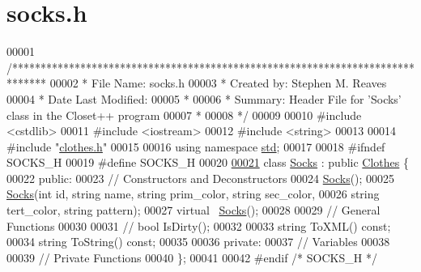\hypertarget{socks_8h_source}{}\section{socks.\+h}

\begin{DoxyCode}
00001 \textcolor{comment}{/******************************************************************************}
00002 \textcolor{comment}{ * File Name: socks.h}
00003 \textcolor{comment}{ * Created by: Stephen M. Reaves}
00004 \textcolor{comment}{ * Date Last Modified:}
00005 \textcolor{comment}{ *}
00006 \textcolor{comment}{ * Summary: Header File for 'Socks' class in the Closet++ program}
00007 \textcolor{comment}{ *}
00008 \textcolor{comment}{ */}
00009 
00010 \textcolor{preprocessor}{#include <cstdlib>}
00011 \textcolor{preprocessor}{#include <iostream>}
00012 \textcolor{preprocessor}{#include <string>}
00013 
00014 \textcolor{preprocessor}{#include "\mbox{\hyperlink{clothes_8h}{clothes.h}}"}
00015 
00016 \textcolor{keyword}{using namespace }\mbox{\hyperlink{namespacestd}{std}};
00017 
00018 \textcolor{preprocessor}{#ifndef SOCKS\_H}
00019 \textcolor{preprocessor}{#define SOCKS\_H}
00020 
\mbox{\hyperlink{classSocks}{00021}} \textcolor{keyword}{class }\mbox{\hyperlink{classSocks}{Socks}} : \textcolor{keyword}{public} \mbox{\hyperlink{classClothes}{Clothes}} \{
00022  \textcolor{keyword}{public}:
00023   \textcolor{comment}{// Constructors and Deconstructors}
00024   \mbox{\hyperlink{classSocks}{Socks}}();
00025   \mbox{\hyperlink{classSocks}{Socks}}(\textcolor{keywordtype}{int} \textcolor{keywordtype}{id}, \textcolor{keywordtype}{string} name, \textcolor{keywordtype}{string} prim\_color, \textcolor{keywordtype}{string} sec\_color,
00026         \textcolor{keywordtype}{string} tert\_color, \textcolor{keywordtype}{string} pattern);
00027   \textcolor{keyword}{virtual} ~\mbox{\hyperlink{classSocks}{Socks}}();
00028 
00029   \textcolor{comment}{// General Functions}
00030 
00031   \textcolor{comment}{// bool IsDirty();}
00032 
00033   \textcolor{keywordtype}{string} ToXML() \textcolor{keyword}{const};
00034   \textcolor{keywordtype}{string} ToString() \textcolor{keyword}{const};
00035 
00036  \textcolor{keyword}{private}:
00037   \textcolor{comment}{// Variables}
00038 
00039   \textcolor{comment}{// Private Functions}
00040 \};
00041 
00042 \textcolor{preprocessor}{#endif }\textcolor{comment}{/* SOCKS\_H */}\textcolor{preprocessor}{}
\end{DoxyCode}
